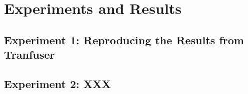 \chapter{Experiments and Results}
\label{chap:results}


\section{Experiment 1: Reproducing the Results from Tranfuser}


\section{Experiment 2: XXX}
